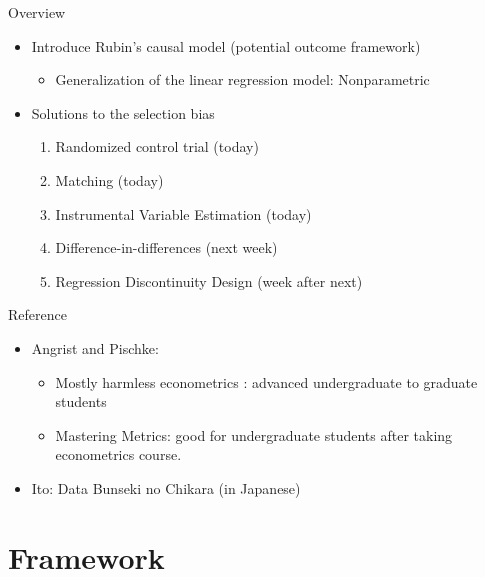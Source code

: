 \documentclass[
  ignorenonframetext,
]{beamer}
\providecommand{\tightlist}{%
  \setlength{\itemsep}{0pt}\setlength{\parskip}{0pt}}
\begin{document}
\begin{frame}{Overview}
\protect\hypertarget{overview}{}
\begin{itemize}
\item
  Introduce Rubin's causal model (potential outcome framework)

  \begin{itemize}
  \tightlist
  \item
    Generalization of the linear regression model: Nonparametric
  \end{itemize}
\item
  Solutions to the selection bias

  \begin{enumerate}
  \item
    Randomized control trial (today)
  \item
    Matching (today)
  \item
    Instrumental Variable Estimation (today)
  \item
    Difference-in-differences (next week)
  \item
    Regression Discontinuity Design (week after next)
  \end{enumerate}
\end{itemize}
\end{frame}

\begin{frame}{Reference}
\protect\hypertarget{reference}{}
\begin{itemize}
\item
  Angrist and Pischke:

  \begin{itemize}
  \item
    Mostly harmless econometrics : advanced undergraduate to graduate
    students
  \item
    Mastering Metrics: good for undergraduate students after taking
    econometrics course.
  \end{itemize}
\item
  Ito: Data Bunseki no Chikara (in Japanese)
\end{itemize}
\end{frame}

\hypertarget{framework}{%
\section{Framework}\label{framework}}
\end{document}
